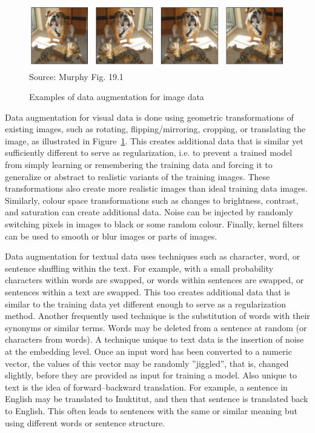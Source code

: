 \begin{figure}
\begin{center}
\includegraphics[width=\textwidth]{murphy_19_01.png} \\

\scriptsize Source: Murphy Fig. 19.1
\end{center}
\caption{Examples of data augmentation for image data}
\label{fig:murphy_19_1}
\end{figure}

Data augmentation for visual data is done using geometric transformations of existing images, such as rotating, flipping/mirroring, cropping, or translating the image, as illustrated in Figure~\ref{fig:murphy_19_1}. This creates additional data that is similar yet sufficiently different to serve as regularization, i.e. to prevent a trained model from simply learning or remembering the training data and forcing it to generalize or abstract to realistic variants of the training images. These transformations also create more realistic images than ideal training data images. Similarly, colour space transformations such as changes to brightness, contrast, and saturation can create additional data. Noise can be injected by randomly switching pixels in images to black or some random colour. Finally, kernel filters can be used to smooth or blur images or parts of images.  

Data augmentation for textual data uses techniques such as character, word, or sentence shuffling within the text. For example, with a small probability characters within words are swapped, or words within sentences are swapped, or sentences within a text are swapped. This too creates additional data that is similar to the training data yet different enough to serve as a regularization method. Another frequently used technique is the substitution of words with their synonyms or similar terms. Words may be deleted from a sentence at random (or characters from words). A technique unique to text data is the insertion of noise at the embedding level. Once an input word has been converted to a numeric vector, the values of this vector may be randomly ''jiggled'', that is, changed slightly, before they are provided as input for training a model. Also unique to text is the idea of forward--backward translation. For example, a sentence in English may be translated to Inuktitut, and then that sentence is translated back to English. This often leads to sentences with the same or similar meaning but using different words or sentence structure. 

